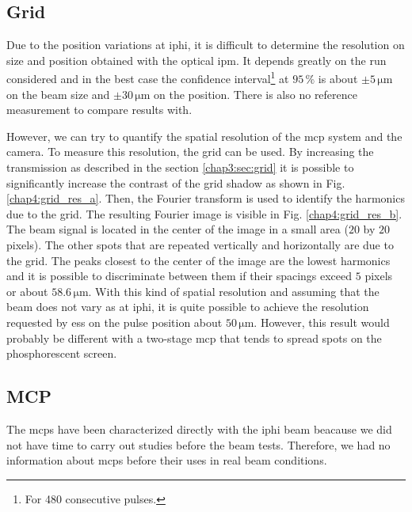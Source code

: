 \begin{refsection}
  \subsection{Grid}

  Due to the position variations at \acrshort{iphi}, it is difficult to determine the resolution on size and position obtained with the optical \acrshort{ipm}. It depends greatly on the run considered and in the best case the confidence interval\footnote{For 480 consecutive pulses.} at $95\,\mathrm{\%}$ is about $\pm 5\,\mathrm{\mu m}$ on the beam size and $\pm 30\,\mathrm{\mu m}$ on the position. There is also no reference measurement to compare results with.

  However, we can try to quantify the spatial resolution of the \acrshort{mcp} system and the camera.
  To measure this resolution, the grid can be used. By increasing the transmission as described in the section \ref{chap3:sec:grid} it is possible to significantly increase the contrast of the grid shadow as shown in Fig. \ref{chap4:grid_res_a}. Then, the Fourier transform is used to identify the harmonics due to the grid. The resulting Fourier image is visible in Fig. \ref{chap4:grid_res_b}. The beam signal is located in the center of the image in a small area ($20$ by $20$ pixels). The other spots that are repeated vertically and horizontally are due to the grid. The peaks closest to the center of the image are the lowest harmonics and it is possible to discriminate between them if their spacings exceed $5$ pixels or about $58.6\,\mathrm{\mu m}$. With this kind of spatial resolution and assuming that the beam does not vary as at \acrshort{iphi}, it is quite possible to achieve the resolution requested by \acrshort{ess} on the pulse position about $50\,\mathrm{\mu m}$. However, this result would probably be different with a two-stage \acrshort{mcp} that tends to spread spots on the phosphorescent screen.

  

  \subsection{MCP}
  The \acrshort{mcp}s have been characterized directly with the \acrshort{iphi} beam beacause we did not have time to carry out studies before the beam tests. Therefore, we had no information about \acrshort{mcp}s before their uses in real beam conditions.


\end{refsection}
